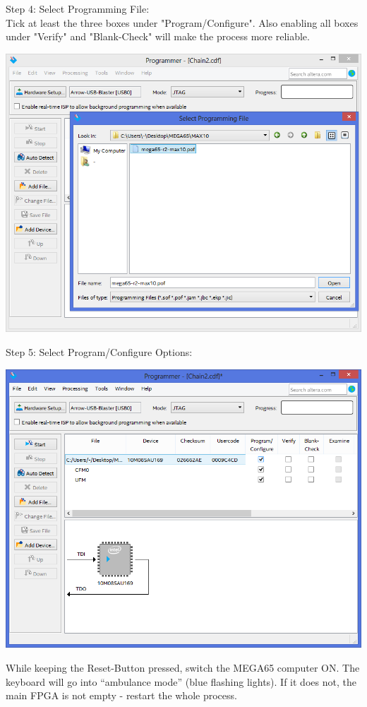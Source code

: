 \begin{minipage}{\linewidth}
Step 4: Select Programming File: \\
Tick at least the three boxes under "Program/Configure".
Also enabling all boxes under "Verify" and "Blank-Check"
will make the process more reliable.
  \begin{center}
  \includegraphics[width=0.7\linewidth]{images/max10_04.png}
  \end{center}
\end{minipage}

\vspace{5mm}

\begin{minipage}{\linewidth}
Step 5: Select Program/Configure Options:
  \begin{center}
  \includegraphics[width=0.7\linewidth]{images/max10_05.png}
  \end{center}
\end{minipage}

While keeping the Reset-Button pressed, switch the MEGA65 computer ON.
The keyboard will go into ``ambulance mode'' (blue flashing lights).
If it does not, the main FPGA is not empty - restart the whole process.


